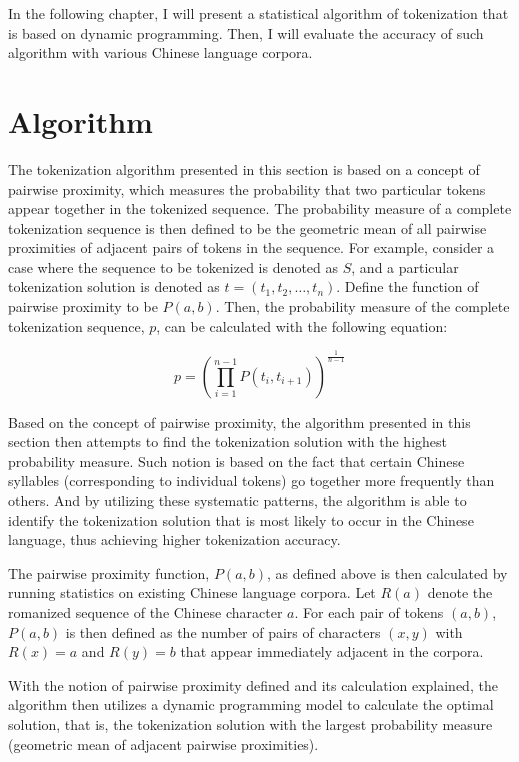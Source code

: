\documentclass[a4paper,11pt,twocolumn]{article}
\begin{document}
In the following chapter, I will present a statistical algorithm of tokenization that is based on dynamic programming. Then, I will evaluate the accuracy of such algorithm with various Chinese language corpora.

\section{Algorithm}

The tokenization algorithm presented in this section is based on a concept of pairwise proximity, which measures the probability that two particular tokens appear together in the tokenized sequence. The probability measure of a complete tokenization sequence is then defined to be the geometric mean of all pairwise proximities of adjacent pairs of tokens in the sequence. For example, consider a case where the sequence to be tokenized is denoted as $S$, and a particular tokenization solution is denoted as $t=(t_1, t_2, \ldots, t_n)$. Define the function of pairwise proximity to be $P(a, b)$. Then, the probability measure of the complete tokenization sequence, $p$, can be calculated with the following equation:

$$p = \left(\prod_{i=1}^{n-1}{P(t_i,t_{i+1})}\right)^{\frac{1}{n-1}}$$

Based on the concept of pairwise proximity, the algorithm presented in this section then attempts to find the tokenization solution with the highest probability measure. Such notion is based on the fact that certain Chinese syllables (corresponding to individual tokens) go together more frequently than others. And by utilizing these systematic patterns, the algorithm is able to identify the tokenization solution that is most likely to occur in the Chinese language, thus achieving higher tokenization accuracy.

The pairwise proximity function, $P(a, b)$, as defined above is then calculated by running statistics on existing Chinese language corpora. Let $R(a)$ denote the romanized sequence of the Chinese character $a$. For each pair of tokens $(a, b)$, $P(a, b)$ is then defined as the number of pairs of characters $(x, y)$ with $R(x) = a$ and $R(y) = b$ that appear immediately adjacent in the corpora.

With the notion of pairwise proximity defined and its calculation explained, the algorithm then utilizes a dynamic programming model to calculate the optimal solution, that is, the tokenization solution with the largest probability measure (geometric mean of adjacent pairwise proximities).
\end{document}
